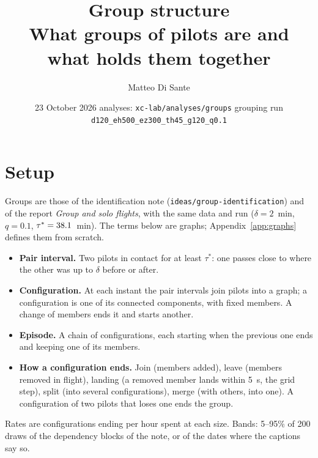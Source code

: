 \documentclass[10pt,a4paper]{article}
\title{\textbf{Group structure}\\[2pt]
  \large What groups of pilots are and what holds them together}
\author{Matteo Di Sante}
\date{23 October 2026 \;\textbullet\; analyses: \texttt{xc-lab/analyses/groups} \;\textbullet\;
  grouping run \texttt{d120\_eh500\_ez300\_th45\_g120\_q0.1}}
\begin{document}
\maketitle
\vspace{-14pt}



\section{Setup}\label{sec:setup}

Groups are those of the identification note (\texttt{ideas/group-identification}) and of the
report \emph{Group and solo flights}, with the same data and run ($\delta=2$~min, $q=0.1$,
$\tau^*=38.1$~min). The terms below are graphs; Appendix~\ref{app:graphs} defines them from
scratch.

\begin{itemize}
  \item \textbf{Pair interval.} Two pilots in contact for at least $\tau^*$: one passes close to
        where the other was up to $\delta$ before or after.
  \item \textbf{Configuration.} At each instant the pair intervals join pilots into a graph; a
        configuration is one of its connected components, with fixed members. A change of
        members ends it and starts another.
  \item \textbf{Episode.} A chain of configurations, each starting when the previous one ends
        and keeping one of its members.
  \item \textbf{How a configuration ends.} Join (members added), leave (members removed in
        flight), landing (a removed member lands within 5~s, the grid step), split (into
        several configurations), merge (with others, into one). A configuration of two pilots
        that loses one ends the group.
\end{itemize}

Rates are configurations ending per hour spent at each size. Bands: 5--95\% of 200 draws of the
dependency blocks of the note, or of the dates where the captions say so.








\end{document}
